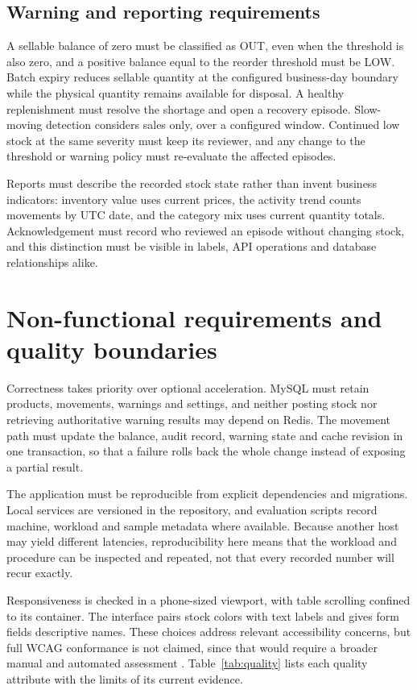 \subsection{Warning and reporting requirements}

A sellable balance of zero must be classified as OUT, even when the threshold is also zero, and a positive balance equal to the reorder threshold must be LOW. Batch expiry reduces sellable quantity at the configured business-day boundary while the physical quantity remains available for disposal. A healthy replenishment must resolve the shortage and open a recovery episode. Slow-moving detection considers sales only, over a configured window. Continued low stock at the same severity must keep its reviewer, and any change to the threshold or warning policy must re-evaluate the affected episodes.


Reports must describe the recorded stock state rather than invent business indicators: inventory value uses current prices, the activity trend counts movements by UTC date, and the category mix uses current quantity totals. Acknowledgement must record who reviewed an episode without changing stock, and this distinction must be visible in labels, API operations and database relationships alike.


\FloatBarrier

\section{Non-functional requirements and quality boundaries}

Correctness takes priority over optional acceleration. MySQL must retain products, movements, warnings and settings, and neither posting stock nor retrieving authoritative warning results may depend on Redis. The movement path must update the balance, audit record, warning state and cache revision in one transaction, so that a failure rolls back the whole change instead of exposing a partial result.


The application must be reproducible from explicit dependencies and migrations. Local services are versioned in the repository, and evaluation scripts record machine, workload and sample metadata where available. Because another host may yield different latencies, reproducibility here means that the workload and procedure can be inspected and repeated, not that every recorded number will recur exactly.


Responsiveness is checked in a phone-sized viewport, with table scrolling confined to its container. The interface pairs stock colors with text labels and gives form fields descriptive names. These choices address relevant accessibility concerns, but full WCAG conformance is not claimed, since that would require a broader manual and automated assessment \citep{wcag}. Table~\ref{tab:quality} lists each quality attribute with the limits of its current evidence.


